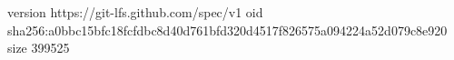 version https://git-lfs.github.com/spec/v1
oid sha256:a0bbc15bfc18fcfdbc8d40d761bfd320d4517f826575a094224a52d079c8e920
size 399525
